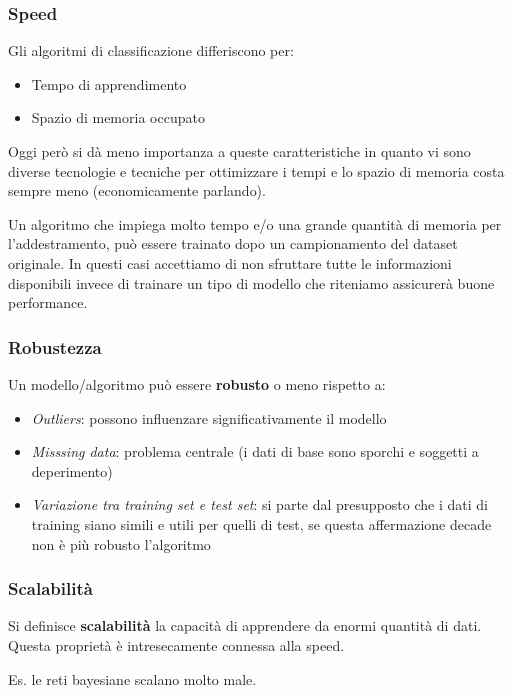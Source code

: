 \subsubsection{Speed}
Gli algoritmi di classificazione differiscono per:
\begin{itemize}
	\item Tempo di apprendimento
	\item Spazio di memoria occupato
\end{itemize}
Oggi però si dà meno importanza a queste caratteristiche in quanto vi sono diverse tecnologie e tecniche per ottimizzare i tempi e lo spazio di memoria costa sempre meno (economicamente parlando).

Un algoritmo che impiega molto tempo e/o una grande quantità di memoria per l'addestramento, può essere trainato dopo un campionamento del dataset originale. In questi casi accettiamo di non sfruttare tutte le informazioni disponibili invece di trainare un tipo di modello che riteniamo assicurerà buone performance.

\subsubsection{Robustezza}
\begin{defn}
	Un modello/algoritmo può essere \textbf{robusto} o meno rispetto a:
\begin{itemize}
	\item \textit{Outliers}: possono influenzare significativamente il modello
	\item \textit{Misssing data}: problema centrale (i dati di base sono sporchi e soggetti a deperimento)
	\item \textit{Variazione tra training set e test set}: si parte dal presupposto che i dati di training siano simili e utili per quelli di test, se questa affermazione decade non \`e pi\`u robusto l'algoritmo
\end{itemize}
\subsubsection{Scalabilità}
\end{defn}

\begin{defn}
	Si definisce \textbf{scalabilità} la capacità di apprendere da enormi quantità di dati. Questa proprietà è intresecamente connessa alla speed. 
\end{defn}
Es. le reti bayesiane scalano molto male. 



